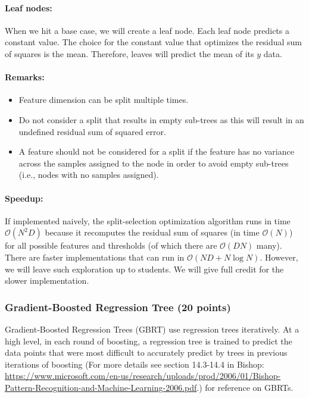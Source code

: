 \documentclass[11pt]{article}
\begin{document}
\paragraph{Leaf nodes: }
When we hit a base case, we will create a leaf node.  Each leaf node predicts a
constant value.  The choice for the constant value that optimizes the residual
sum of squares is the mean.  Therefore, leaves will predict the mean of its
$y$ data.


\paragraph{Remarks:}

\begin{itemize}
\item Feature dimension can be split multiple times.
\item Do not consider a split that results in empty sub-trees as this will result in an undefined residual sum of squared error.
\item A feature should not be considered for a split if the feature has no
  variance across the samples assigned to the node in order to avoid empty
  sub-trees (i.e., nodes with no samples assigned).
\end{itemize}


\paragraph{Speedup:}
If implemented naively, the split-selection optimization algorithm runs in time
$\mathcal{O}(N^2 D)$ because it recomputes the residual sum of squares (in time
$\mathcal{O}(N)$) for all possible features and thresholds (of which there are
$\mathcal{O}(D N)$ many). There are faster implementations that can run in
$\mathcal{O}(N D + N \log N)$.  However, we will leave such exploration up to
students.  We will give full credit for the slower implementation.

\newpage
\subsubsection{Gradient-Boosted Regression Tree (20 points)}
Gradient-Boosted Regression Trees (GBRT) use regression trees iteratively. At a high level, in each round of boosting, a regression tree is trained to predict the data points that were most difficult to accurately predict by trees in previous iterations of boosting (For more details see section 14.3-14.4 in Bishop: \url{https://www.microsoft.com/en-us/research/uploads/prod/2006/01/Bishop-Pattern-Recognition-and-Machine-Learning-2006.pdf}.) for reference on GBRTs.
\end{document}
